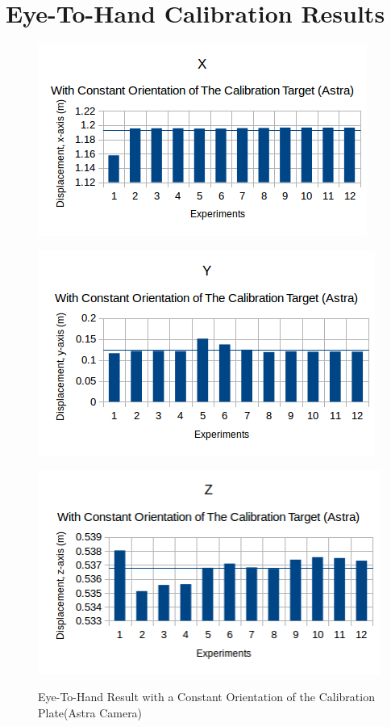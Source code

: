 \appendix
\chapter*{Eye-To-Hand Calibration Results}
\label{chap:resultsa}


\begin{figure}[htp]
\begin{center}
{
  \includegraphics[clip,width=0.5\columnwidth]{figures/constantorientation_astra_x.png}%
}
\end{center}
\begin{center}
{
  \includegraphics[clip,width=0.5\columnwidth]{figures/constantorientation_astra_y.png}%
}
\end{center}

\begin{center}
{
  \includegraphics[clip,width=0.5\columnwidth]{figures/constantorientation_astra_z.png}%
}
\end{center}
\caption{Eye-To-Hand Result with a Constant Orientation of the Calibration Plate(Astra Camera)}
\end{figure}

